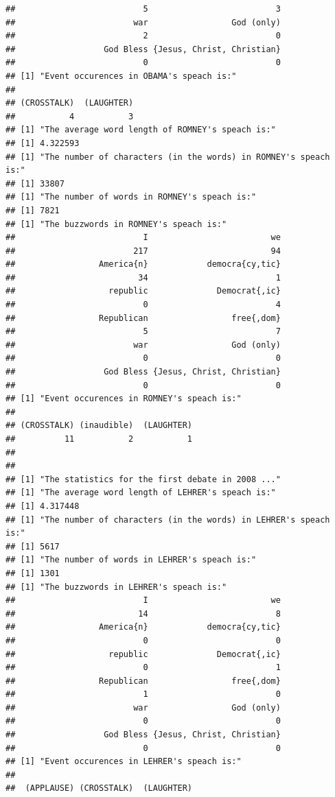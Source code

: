 \documentclass{article}\usepackage[]{graphicx}\usepackage[]{color}
\makeatletter
\newenvironment{kframe}{%
 \def\at@end@of@kframe{}%
 \ifinner\ifhmode%
  \def\at@end@of@kframe{\end{minipage}}%
  \begin{minipage}{\columnwidth}%
 \fi\fi%
 \def\FrameCommand##1{\hskip\@totalleftmargin \hskip-\fboxsep
 \colorbox{shadecolor}{##1}\hskip-\fboxsep
     \hskip-\linewidth \hskip-\@totalleftmargin \hskip\columnwidth}%
 \MakeFramed {\advance\hsize-\width
   \@totalleftmargin\z@ \linewidth\hsize
   \@setminipage}}%
 {\par\unskip\endMakeFramed%
 \at@end@of@kframe}
\newenvironment{knitrout}{}{} %
\makeatother
\begin{document}
\begin{knitrout}
\begin{kframe}
\begin{verbatim}
##                          5                          3 
##                        war                 God (only) 
##                          2                          0 
##                  God Bless {Jesus, Christ, Christian} 
##                          0                          0 
## [1] "Event occurences in OBAMA's speach is:"
## 
## (CROSSTALK)  (LAUGHTER) 
##           4           3 
## [1] "The average word length of ROMNEY's speach is:"
## [1] 4.322593
## [1] "The number of characters (in the words) in ROMNEY's speach is:"
## [1] 33807
## [1] "The number of words in ROMNEY's speach is:"
## [1] 7821
## [1] "The buzzwords in ROMNEY's speach is:"
##                          I                         we 
##                        217                         94 
##                 America{n}            democra{cy,tic} 
##                         34                          1 
##                   republic              Democrat{,ic} 
##                          0                          4 
##                 Republican                 free{,dom} 
##                          5                          7 
##                        war                 God (only) 
##                          0                          0 
##                  God Bless {Jesus, Christ, Christian} 
##                          0                          0 
## [1] "Event occurences in ROMNEY's speach is:"
## 
## (CROSSTALK) (inaudible)  (LAUGHTER) 
##          11           2           1 
## 
## 
## [1] "The statistics for the first debate in 2008 ..."
## [1] "The average word length of LEHRER's speach is:"
## [1] 4.317448
## [1] "The number of characters (in the words) in LEHRER's speach is:"
## [1] 5617
## [1] "The number of words in LEHRER's speach is:"
## [1] 1301
## [1] "The buzzwords in LEHRER's speach is:"
##                          I                         we 
##                         14                          8 
##                 America{n}            democra{cy,tic} 
##                          0                          0 
##                   republic              Democrat{,ic} 
##                          0                          1 
##                 Republican                 free{,dom} 
##                          1                          0 
##                        war                 God (only) 
##                          0                          0 
##                  God Bless {Jesus, Christ, Christian} 
##                          0                          0 
## [1] "Event occurences in LEHRER's speach is:"
## 
##  (APPLAUSE) (CROSSTALK)  (LAUGHTER) 

\end{verbatim}
\end{kframe}
\end{knitrout}
\end{document}

